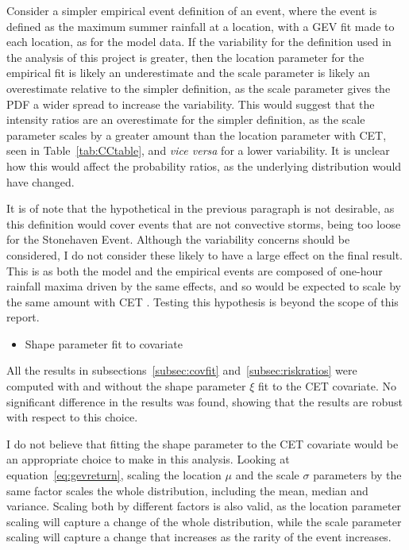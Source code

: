 Consider a simpler empirical event definition of an event,
    where the event is defined as the maximum summer rainfall at a location,
    with a GEV fit made to each location, as for the model data.
If the variability for the definition used in the analysis of this project is greater,
    then the location parameter for the empirical fit is likely an underestimate and the scale parameter is likely
    an overestimate relative to the simpler definition,
    as the scale parameter gives the PDF a wider spread to increase the variability.
This would suggest that the intensity ratios are an overestimate for the simpler definition,
    as the scale parameter scales by a greater amount than the location parameter with CET,
    seen in Table~\ref{tab:CCtable},
    and \textit{vice versa} for a lower variability.
It is unclear how this would affect the probability ratios,
    as the underlying distribution would have changed.

It is of note that the hypothetical in the previous paragraph is not desirable,
    as this definition would cover events that are not convective storms,
    being too loose for the Stonehaven Event.
Although the variability concerns should be considered,
    I do not consider these likely to have a large effect on the final result.
This is as both the model and the empirical events are composed of one-hour rainfall maxima driven by the same effects,
    and so would be expected to scale by the same amount with CET .
Testing this hypothesis is beyond the scope of this report.

\begin{itemize}\item Shape parameter fit to covariate\end{itemize}

All the results in subsections~\ref{subsec:covfit} and~\ref{subsec:riskratios} were computed with and without
    the shape parameter $\xi$ fit to the CET covariate.
No significant difference in the results was found,
    showing that the results are robust with respect to this choice.

I do not believe that fitting the shape parameter to the CET covariate would be an appropriate choice to make in this analysis.
Looking at equation~\ref{eq:gevreturn},
    scaling the location $\mu$ and the scale $\sigma$ parameters by the same factor scales the whole distribution,
    including the mean, median and variance.
Scaling both by different factors is also valid,
    as the location parameter scaling will capture a change of the whole distribution,
    while the scale parameter scaling will capture a change that increases as the rarity of the event increases.

